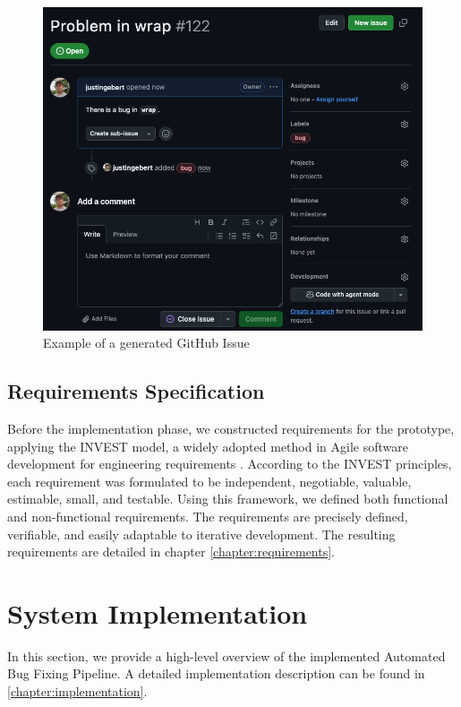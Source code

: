 \begin{figure}[H]
    \centering
    \includegraphics[width=1\textwidth]{images/github/github_issue.png}
    \caption{Example of a generated GitHub Issue}
    \label{fig:gh-issue2}
\end{figure}

\subsection{Requirements Specification}

Before the implementation phase, we constructed requirements for the prototype, applying the INVEST model, a widely adopted method in Agile software development for engineering requirements \cite{10.5555/984017}. According to the INVEST principles, each requirement was formulated to be independent, negotiable, valuable, estimable, small, and testable. Using this framework, we defined both functional and non-functional requirements. The requirements are precisely defined, verifiable, and easily adaptable to iterative development. The resulting requirements are detailed in chapter \ref{chapter:requirements}.

\section{System Implementation}

In this section, we provide a high-level overview of the implemented Automated Bug Fixing Pipeline. A detailed implementation description can be found in \ref{chapter:implementation}.

